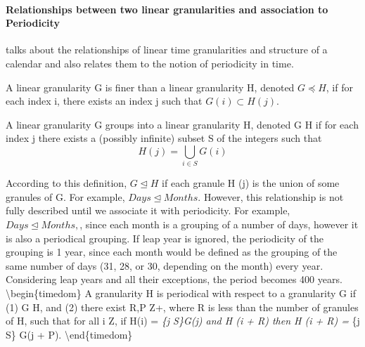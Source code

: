 \documentclass[12pt]{article}
\begin{document}
\hypertarget{relationships-between-two-linear-granularities-and-association-to-periodicity}{%
\paragraph{Relationships between two linear granularities and
association to
Periodicity}\label{relationships-between-two-linear-granularities-and-association-to-periodicity}}

\citep{Bettini1998-ed} talks about the relationships of linear time
granularities and structure of a calendar and also relates them to the
notion of periodicity in time.

\begin{timedom}\label{def:finerthan}
A linear granularity G is finer than a  linear granularity H, denoted $G \preceq H$, if
for each index i, there exists an index j such that $G(i) \subset H(j)$.
\end{timedom}

\begin{timedom}\label{def:groupsinto}
A linear granularity G groups into a linear granularity H, denoted
G \trianglelefteq H 
if for each index j there exists a (possibly infinite) subset S of the integers such
that
\begin{equation}
H(j) = \bigcup_{i \in S}G(i)
\end{equation}
\end{timedom}

According to this definition, \(G \trianglelefteq H\) if each granule H
(j) is the union of some granules of G. For example,
\(Days \trianglelefteq Months\). However, this relationship is not fully
described until we associate it with periodicity. For example,
\(Days \trianglelefteq Months,\), since each month is a grouping of a
number of days, however it is also a periodical grouping. If leap year
is ignored, the periodicity of the grouping is 1 year, since each month
would be defined as the grouping of the same number of days (31, 28, or
30, depending on the month) every year. Considering leap years and all
their exceptions, the period becomes 400 years.
\textbackslash{}begin\{timedom\}\label{def:periodical} A granularity H
is periodical with respect to a granularity G if (1) G
\trianglelefteq H, and (2) there exist R,P \epsilon Z+, where R is less
than the number of granules of H, such that for all i \epsilon Z, if
H(i) = \bigcup\emph{\{j \in S\}G(j) and H (i + R) \neq \phi then H (i +
R) = \bigcup}\{j \in S\} G(j + P). \textbackslash{}end\{timedom\}
\end{document}
